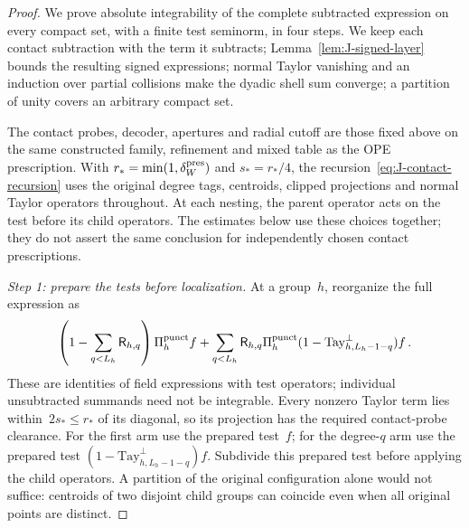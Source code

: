 \begin{proof}\label{proof:J2.2-start}
We prove absolute integrability of the complete subtracted expression on every compact set, with a finite test seminorm, in four steps. We keep each contact subtraction with the term it subtracts; Lemma~\ref{lem:J-signed-layer} bounds the resulting signed expressions; normal Taylor vanishing and an induction over partial collisions make the dyadic shell sum converge; a partition of unity covers an arbitrary compact set.

The contact probes, decoder, apertures and radial cutoff are those fixed above on the same constructed family, refinement and mixed table as the OPE prescription. With $r_*=\min(1,\delta_W^{\rm pres})$ and $s_*=r_*/4$, the recursion~\eqref{eq:J-contact-recursion} uses the original degree tags, centroids, clipped projections and normal Taylor operators throughout. At each nesting, the parent operator acts on the test before its child operators. The estimates below use these choices together; they do not assert the same conclusion for independently chosen contact prescriptions.

\emph{Step 1: prepare the tests before localization.} At a group~$h$, reorganize the full expression as
\begin{equation}\label{eq:J-contact-arms}
\left(1-\sum_{q<L_h}\mathsf R_{h,q}\right)\Pi_h^{\rm punct}f
+\sum_{q<L_h}\mathsf R_{h,q}\Pi_h^{\rm punct}
                  (1-\mathrm{Tay}_{h,L_h-1-q}^{\perp})f\,.
\end{equation}
These are identities of field expressions with test operators; individual unsubtracted summands need not be integrable. Every nonzero Taylor term lies within~$2s_*\le r_*$ of its diagonal, so its projection has the required contact-probe clearance. For the first arm use the prepared test~$f$; for the degree-$q$ arm use the prepared test $(1-\mathrm{Tay}_{h,L_h-1-q}^{\perp})f$. Subdivide this prepared test before applying the child operators. A partition of the original configuration alone would not suffice: centroids of two disjoint child groups can coincide even when all original points are distinct.


\end{proof}

